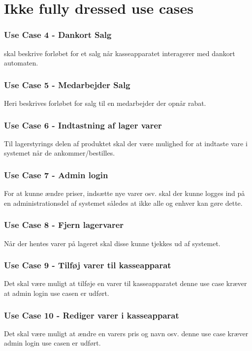 \section{Ikke fully dressed use cases}

\subsubsection*{Use Case 4 - Dankort Salg}
skal beskrive forløbet for et salg når kasseapparatet interagerer med dankort automaten.

\subsubsection*{Use Case 5 - Medarbejder Salg}
Heri beskrives forløbet for salg til en medarbejder der opnår rabat.

\subsubsection*{Use Case 6 - Indtastning af lager varer}
Til lagerstyrings delen af produktet skal der være mulighed for at indtaste vare i systemet når de ankommer/bestilles.

\subsubsection*{Use Case 7 - Admin login}
For at kunne ændre priser, indsætte nye varer osv. skal der kunne logges ind på en administrationsdel af systemet således at ikke alle og enhver kan gøre dette.

\subsubsection*{Use Case 8 - Fjern lagervarer}
Når der hentes varer på lageret skal disse kunne tjekkes ud af systemet.

\subsubsection*{Use Case 9 - Tilføj varer til kasseapparat}
Det skal være muligt at tilføje en varer til kasseapparatet denne use case kræver at admin login use casen er udført.

\subsubsection*{Use Case 10 - Rediger varer i kasseapparat}
Det skal være muligt at ændre en varers pris og navn osv. denne use case kræver admin login use casen er udført.

